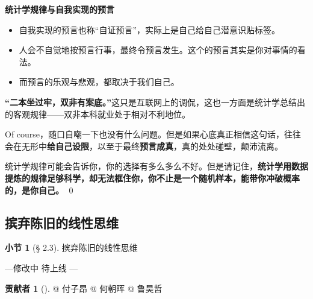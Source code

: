 \documentclass{beamer}	%
\theoremstyle{plain}
\theoremstyle{definition}
\newtheorem{ex}{贡献者}[section]
\newtheorem{dfn}{小节}[section]
\theoremstyle{remark}
\numberwithin{equation}{section}
\begin{document}
\begin{frame}
	\begin{LARGE}
		\textbf{统计学规律与自我实现的预言}
	\end{LARGE}
	\vspace{1cm}

	\begin{itemize}
		\item 自我实现的预言也称“自证预言”，实际上是自己给自己潜意识贴标签。
		\vspace{0.25cm}

		\item 人会不自觉地按预言行事，最终令预言发生。这个的预言其实是你对事情的看法。
		\vspace{0.25cm}
		
		\item 而预言的乐观与悲观，都取决于我们自己。
	\end{itemize}

\end{frame}

\begin{frame}
	\textbf{“二本坐过牢，双非有案底。”}这只是互联网上的调侃，这也一方面是统计学总结出的客观规律——双非本科就业处于相对不利地位。
	\vspace{0.5cm}

	Of course，随口自嘲一下也没有什么问题。但是如果心底真正相信这句话，往往会在无形中\textbf{给自己设限}，以至于最终\textbf{预言成真}，真的处处碰壁，颠沛流离。
	\vspace{0.5cm}

	统计学规律可能会告诉你，你的选择有多么多么不好。但是请记住，\textbf{统计学用数据提炼的规律足够科学，却无法框住你，你不止是一个随机样本，能带你冲破概率的，是你自己。}
	\qed
\end{frame}

\subsection{摈弃陈旧的线性思维}
\begin{frame}
	\begin{dfn}[§ 2.3]
		摈弃陈旧的线性思维
		\vspace{0.25cm}

		---\space 修改中 \space 待上线 ---
	\end{dfn}

	\begin{ex}[]
		@ 付子昂 @ 何朝晖 @ 鲁昊哲
	\end{ex}
\end{frame}
\end{document}
